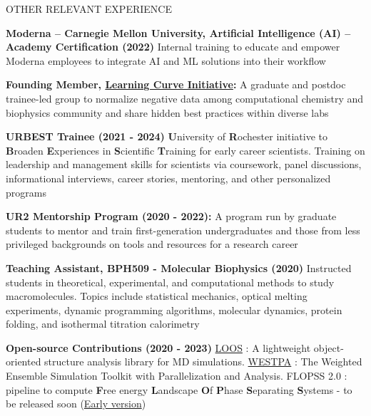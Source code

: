 \documentclass{resume} %
\begin{document}
\begin{rSection}{OTHER RELEVANT EXPERIENCE}
   \vspace{-1.25em}
   \item \textbf{Moderna – Carnegie Mellon University, Artificial Intelligence (AI) – Academy Certification (2022)} {
      Internal training to educate and empower Moderna employees to integrate AI and ML solutions into their workflow}
   \item \textbf{Founding Member,  \href{https://learning-curve-initiative.github.io/about/}{Learning Curve Initiative}:} {A graduate and postdoc trainee-led group to normalize negative data among computational chemistry and biophysics community and share hidden best practices within diverse labs}
   \item \textbf{URBEST Trainee (2021 - 2024)} {\textbf{U}niversity of \textbf{R}ochester initiative to \textbf{B}roaden \textbf{E}xperiences in \textbf{S}cientific \textbf{T}raining for early career scientists. Training on leadership and management skills for scientists via coursework, panel discussions, informational interviews, career stories, mentoring, and other personalized programs}
   \item \textbf{UR2 Mentorship Program (2020 - 2022):} {A program run by graduate students to mentor and train first-generation undergraduates and those from less privileged backgrounds on tools and resources for a research career}
   \item \textbf{Teaching Assistant, BPH509 - Molecular Biophysics (2020)} {Instructed students in theoretical, experimental, and computational methods to study macromolecules. Topics include statistical mechanics, optical melting experiments, dynamic
      programming algorithms, molecular dynamics, protein folding, and isothermal titration calorimetry
   }
   \item \textbf{Open-source Contributions (2020 - 2023)} {\href{https://github.com/GrossfieldLab/loos}{LOOS} : A lightweight object-oriented structure analysis library for MD simulations.
      \href{https://github.com/westpa/westpa}{WESTPA} : The Weighted Ensemble Simulation Toolkit with Parallelization and Analysis}. FLOPSS 2.0 : pipeline to compute \textbf{F}ree energy \textbf{L}andscape \textbf{O}f \textbf{P}hase \textbf{S}eparating \textbf{S}ystems - to be released soon (\href{https://github.com/Poruthoor/Phase_Separation_Article/tree/main/FLOPSS}{Early version})
\end{rSection}
\end{document}
